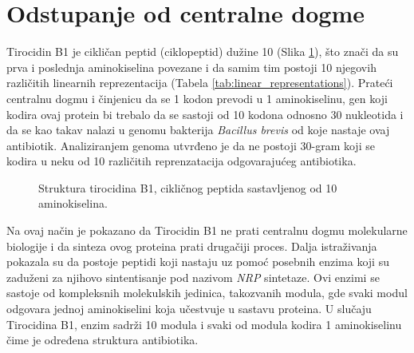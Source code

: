 \documentclass[12pt,oneside]{memoir}
\begin{document}
\section{Odstupanje od centralne dogme}
Tirocidin B1 je cikličan peptid (ciklopeptid) dužine 10 (Slika \ref{fig:tirocidin}), što znači da su prva i poslednja aminokiselina povezane i da samim tim postoji 10 njegovih različitih linearnih reprezentacija (Tabela \ref{tab:linear_representations}). Prateći centralnu dogmu i činjenicu da se 1 kodon prevodi u 1 aminokiselinu, gen koji kodira ovaj protein bi trebalo da se sastoji od 10 kodona odnosno 30 nukleotida i da se kao takav nalazi u genomu bakterija \emph{Bacillus brevis} od koje nastaje ovaj antibiotik. Analiziranjem genoma utvrđeno je da ne postoji 30-gram koji se kodira u neku od 10 različitih reprenzatacija odgovarajućeg antibiotika.

\begin{figure}[h]
  \centering
  
  \caption{Struktura tirocidina B1, cikličnog peptida sastavljenog od 10 aminokiselina.}
  \label{fig:tirocidin}
\end{figure}

Na ovaj način je pokazano da Tirocidin B1 ne prati centralnu dogmu molekularne biologije i da sinteza ovog proteina prati drugačiji proces. Dalja istraživanja pokazala su da postoje peptidi koji nastaju uz pomoć posebnih enzima koji su zaduženi za njihovo sintentisanje pod nazivom \emph{NRP} sintetaze. Ovi enzimi se sastoje od kompleksnih molekulskih jedinica, takozvanih modula, gde svaki modul odgovara jednoj aminokiselini koja učestvuje u sastavu proteina. U slučaju Tirocidina B1, enzim sadrži 10 modula i svaki od modula kodira 1 aminokiselinu čime je određena struktura antibiotika.
\end{document}
